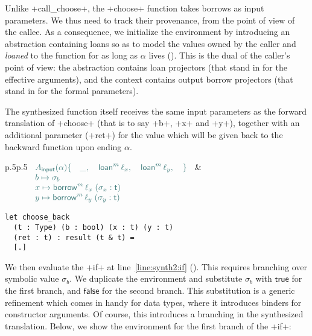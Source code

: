 \documentclass[acmsmall,screen]{acmart}
\newcommand{\Rule}[1]{\hyperlink{#1}{\TirName {#1}}}
\newcommand\kw[1]{\ensuremath{\mathsf{#1}}}
\newcommand\kfalse{\mathsf{false}}
\newcommand\ktrue{\mathsf{true}}
\newcommand\emborrow[2]{\ensuremath{\mathsf{borrow}^m\,#1\;#2}}
\newcommand\emloan[1]{\ensuremath{\mathsf{loan}^m\,#1}}
\begin{document}
\noindent
Unlike \li+call_choose+, the \li+choose+ function takes borrows as input parameters.
We thus need to track their provenance, from the point of view of the callee.
As a consequence, we initialize the environment by introducing an abstraction containing
loans so as to model the values owned
by the caller and \emph{loaned} to the function
for as long as $\alpha$ lives (\Rule{T-Fun-Backward}). This is the dual of the caller's point of view: the abstraction
contains loan projectors (that stand in for the effective arguments), and the context contains
output borrow projectors (that stand in for the formal parameters).

The synthesized function itself receives the same input parameters as the forward translation
of \li+choose+ (that is to say \li+b+, \li+x+ and \li+y+), together with an additional
parameter (\li+ret+) for the value which will be given back to the backward function upon ending
$\alpha$.

\medskip
\noindent
\begin{tabular}{p{}p{}}
\small
$
\color{envcolor}
\begin{array}[t]{l}
  A_\mathsf{input}(\alpha) \{
    \quad \_,
    \quad \emloan \ell_x,
    \quad \emloan \ell_y,
  \quad \}\\
  b \mapsto \sigma_b \quad\\
  x \mapsto \emborrow{\ell_x} (\sigma_x : \kw{t}) \quad\\
  y \mapsto \emborrow{\ell_y} (\sigma_y : \kw{t}) \quad\\
\end{array}
$
\normalsize
&
\begin{minipage}[t]{0.5\textwidth}
\begin{verbatim}
let choose_back
  (t : Type) (b : bool) (x : t) (y : t)
  (ret : t) : result (t & t) =
  [.]
\end{verbatim}
\end{minipage}
\end{tabular}

\medskip
\noindent
We then evaluate the \li+if+ at line~\ref{line:synth2:if} (\Rule{T-IfThenElse}). This requires branching over symbolic
value $\sigma_b$.
We duplicate the environment and substitute $\sigma_b$ with $\ktrue$ for the first
branch, and $\kfalse$ for the second branch.
This substitution is a generic refinement which comes in handy for data types,
where it introduces binders for constructor arguments.
Of course, this introduces a branching in the synthesized translation.
Below, we show the environment for the first branch of the \li+if+:
\end{document}
